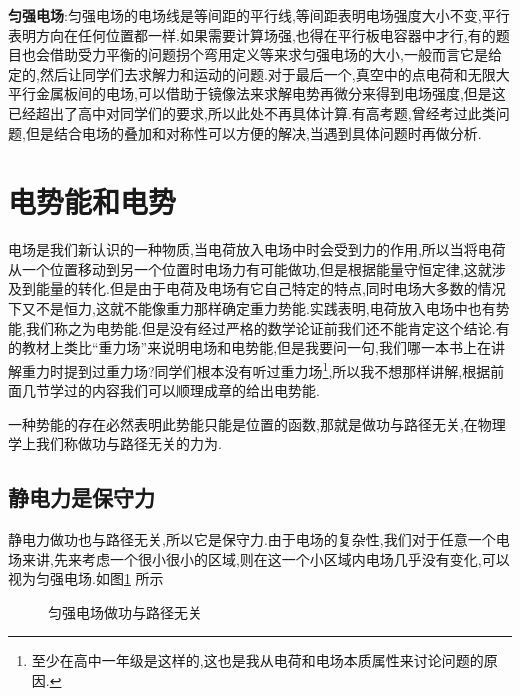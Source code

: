   {\bf 匀强电场}:匀强电场的电场线是等间距的平行线,等间距表明电场强度大小不变,平行表明方向在任何位置都一样.如果需要计算场强,也得在平行板电容器中才行,有的题目也会借助受力平衡的问题拐个弯用定义等来求匀强电场的大小,一般而言它是给定的,然后让同学们去求解力和运动的问题.对于最后一个,真空中的点电荷和无限大平行金属板间的电场,可以借助于镜像法来求解电势再微分来得到电场强度,但是这已经超出了高中对同学们的要求,所以此处不再具体计算.有高考题,曾经考过此类问题,但是结合电场的叠加和对称性可以方便的解决,当遇到具体问题时再做分析.

  \section{电势能和电势}

  电场是我们新认识的一种物质,当电荷放入电场中时会受到力的作用,所以当将电荷从一个位置移动到另一个位置时电场力有可能做功,但是根据能量守恒定律,这就涉及到能量的转化.但是由于电荷及电场有它自己特定的特点,同时电场大多数的情况下又不是恒力,这就不能像重力那样确定重力势能.实践表明,电荷放入电场中也有势能,我们称之为电势能.但是没有经过严格的数学论证前我们还不能肯定这个结论.有的教材上类比``重力场''来说明电场和电势能,但是我要问一句,我们哪一本书上在讲解重力时提到过重力场?同学们根本没有听过重力场\footnote{至少在高中一年级是这样的,这也是我从电荷和电场本质属性来讨论问题的原因.},所以我不想那样讲解,根据前面几节学过的内容我们可以顺理成章的给出电势能.

  一种势能的存在必然表明此势能只能是位置的函数,那就是做功与路径无关,在物理学上我们称做功与路径无关的力为.

  \subsection{静电力是保守力}

  静电力做功也与路径无关,所以它是保守力.由于电场的复杂性,我们对于任意一个电场来讲,先来考虑一个很小很小的区域,则在这一个小区域内电场几乎没有变化,可以视为匀强电场.如图\ref{fig:yuqiangdianchanglujingwufuang} 所示

  \begin{figure}[H]
    \centering
    \caption{匀强电场做功与路径无关}
    \label{fig:yuqiangdianchanglujingwufuang}
  \end{figure}


